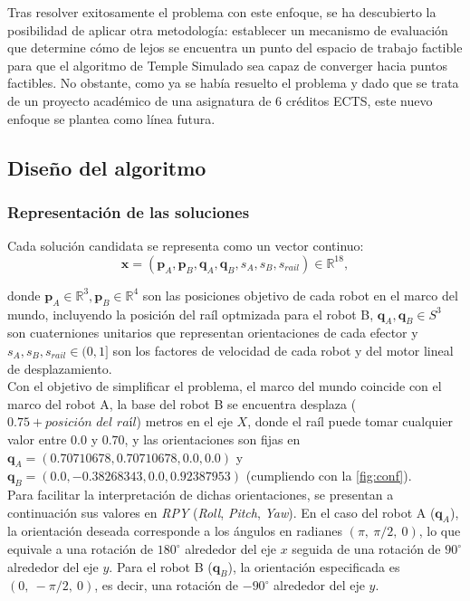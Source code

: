 Tras resolver exitosamente el problema con este enfoque, se ha descubierto la posibilidad de aplicar otra 
metodología:
establecer un mecanismo de evaluación que determine cómo de lejos se encuentra un punto del 
espacio de trabajo factible para que el algoritmo de Temple Simulado sea capaz de converger hacia puntos factibles.
No obstante, como ya se había resuelto el problema y dado que se trata de un proyecto académico de una asignatura
de 6 créditos ECTS, este nuevo enfoque se plantea como línea futura. \\


\subsection*{Diseño del algoritmo}

\subsubsection*{Representación de las soluciones}
Cada solución candidata se representa como un vector continuo:
\begin{equation}
\mathbf{x} =
(\mathbf{p}_A,\mathbf{p}_B,
\mathbf{q}_A,\mathbf{q}_B,
s_A,s_B,s_{rail})
\in \mathbb{R}^{18},
\label{vector}
\end{equation}

donde $\mathbf{p}_A \in \mathbb{R}^3, \mathbf{p}_B \in \mathbb{R}^4$ son las posiciones objetivo de cada robot en el marco
del mundo, incluyendo la posición del raíl optmizada para el robot B,
$\mathbf{q}_A, \mathbf{q}_B \in S^3$ son cuaterniones unitarios que representan orientaciones de cada efector y
$s_A, s_B, s_{rail} \in (0,1]$ son los factores de velocidad de cada robot y del motor lineal de desplazamiento. \\

Con el objetivo de simplificar el problema, el marco del mundo coincide con el marco del robot A, la base
del robot B se encuentra desplaza ($0.75 + \textit{posición del raíl}$) metros en el eje $X$, donde el raíl puede tomar cualquier valor entre $0.0$ y $0.70$, y las orientaciones
son fijas en $\mathbf{q}_A = (0.70710678, 0.70710678, 0.0, 0.0)$ y 
$\mathbf{q}_B = (0.0, -0.38268343, 0.0, 0.92387953)$ (cumpliendo con 
la \autoref{fig:conf}). \\

Para facilitar la interpretación de dichas orientaciones, se presentan a continuación sus valores en \textit{RPY}
(\textit{Roll}, \textit{Pitch}, \textit{Yaw}). En el caso del robot A ($\mathbf{q}_A$),
la orientación deseada corresponde a los ángulos en radianes \((\pi,\ \pi/2,\ 0)\), lo que
equivale a una rotación de \(180^\circ\) alrededor del eje \(x\) seguida de una
rotación de \(90^\circ\) alrededor del eje \(y\). Para el robot B ($\mathbf{q}_B$), la
orientación especificada es \((0,\ -\pi/2,\ 0)\), es decir, una rotación de
\(-90^\circ\) alrededor del eje \(y\).


